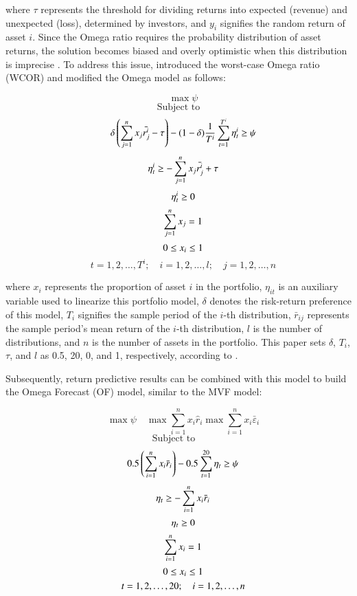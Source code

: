 where $\tau$ represents the threshold for dividing returns into expected (revenue) and unexpected (loss), determined by investors, and $y_i$ signifies the random return of asset $i$. Since the Omega ratio requires the probability distribution of asset returns, the solution becomes biased and overly optimistic when this distribution is imprecise \cite{Kapsos2014}. To address this issue, \cite{Kapsos2014} introduced the worst-case Omega ratio (WCOR) and modified the Omega model as follows:

\[
\quad \max \psi
\]
\[
\text{Subject to}\]
\[ \quad \delta \left( \sum_{j=1}^{n} x_j \bar{r^{i}_{j}} - \tau \right) - (1-\delta) \frac{1}{T^i} \sum_{t=1}^{T^i} \eta^i_{t} \geq \psi \\\]
\[ \quad \eta^i_{t} \geq -\sum_{j=1}^{n} x_j \bar{r^i_j} + \tau \\\]
\[ \quad \eta^i_{t} \geq 0 \\\]
\[ \quad \sum_{j=1}^{n} x_j = 1 \\\]
\[ \quad 0 \leq x_i \leq 1 \\\]
\[ \quad t=1,2,\ldots,T^i; \quad i=1,2,\ldots,l; \quad j=1,2,\ldots,n
\]

where $x_i$ represents the proportion of asset $i$ in the portfolio, $\eta_{it}$ is an auxiliary variable used to linearize this portfolio model, $\delta$ denotes the risk-return preference of this model, $T_i$ signifies the sample period of the $i$-th distribution, $\bar{r}_{ij}$ represents the sample period’s mean return of the $i$-th distribution, $l$ is the number of distributions, and $n$ is the number of assets in the portfolio. This paper sets $\delta$, $T_i$, $\tau$, and $l$ as 0.5, 20, 0, and 1, respectively, according to \cite{Yu2020}.

Subsequently, return predictive results can be combined with this model to build the Omega Forecast (OF) model, similar to the MVF model:

\[
\quad \max \psi \quad \max \sum_{i=1}^{n} x_i \hat{r}_i \max \sum_{i=1}^{n} x_i \bar{\varepsilon}_i
\]
\[
\text{Subject to} \quad\]
\[\quad 0.5 \left( \sum_{i=1}^{n} x_i \bar{r}_i \right) - 0.5 \sum_{t=1}^{20} \eta_t \geq \psi \\\]
\[\quad \eta_t \geq -\sum_{i=1}^{n} x_i \bar{r}_i \\\]
\[\quad \eta_t \geq 0 \\\]
\[\quad \sum_{i=1}^{n} x_i = 1 \\\]
\[\quad 0 \leq x_i \leq 1 \\\]
\[\quad t=1,2,\ldots,20; \quad i=1,2,\ldots,n \\
\]

